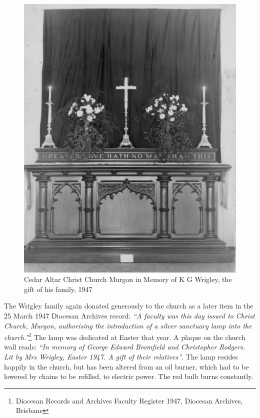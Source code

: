 \begin{figure}
\begin{center}
\includegraphics[width=1.\linewidth,center]{../images/cedarAltar1947.jpg}
\caption{Cedar Altar Christ Church Murgon in Memory of K G Wrigley, the gift of his family, 1947}
\end{center}
\end{figure}




The Wrigley family again donated generously to the church as a later item in the 25 March 1947 Diocesan Archives record: \emph{``A faculty was this day issued to Christ Church, Murgon, authorising the introduction of a silver sanctuary lamp into the church.''}\footnote{Diocesan Records and Archives Faculty Register 1947, Diocesan Archives, Brisbane} The lamp was dedicated at Easter that year. A plaque on the church wall reads: \emph{``In memory of George Edward Bromfield and Christopher Rodgers. Lit by Mrs Wrigley, Easter 1947. A gift of their relatives''}. The lamp resides happily in the church, but has been altered from an oil burner, which had to be lowered by chains to be refilled, to electric power. The red bulb burns constantly.


